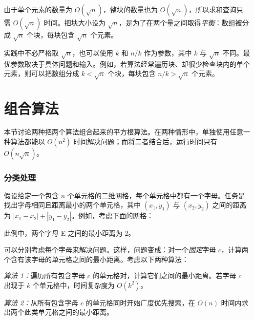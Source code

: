 由于单个元素的数量为 $O(\sqrt n)$，整块的数量也为 $O(\sqrt n)$，所以求和查询只需 $O(\sqrt n)$ 时间。把块大小设为 $\sqrt n$，是为了在两个量之间取得\emph{平衡}：数组被分成 $\sqrt n$ 个块，每块包含 $\sqrt n$ 个元素。

实践中不必严格取 $\sqrt n$，也可以使用 $k$ 和 $n/k$ 作为参数，其中 $k$ 与 $\sqrt n$ 不同。最优参数取决于具体问题和输入。例如，若算法经常遍历块、却很少检查块内的单个元素，则可以把数组分成 $k < \sqrt n$ 个块，每块包含 $n/k > \sqrt n$ 个元素。

\section{组合算法}

本节讨论两种把两个算法组合起来的平方根算法。在两种情形中，单独使用任意一种算法都能以 $O(n^2)$ 时间解决问题；而将二者结合后，运行时间只有 $O(n \sqrt n)$。

\subsubsection{分类处理}

假设给定一个包含 $n$ 个单元格的二维网格，每个单元格中都有一个字母。任务是找出字母相同且距离最小的两个单元格，其中 $(x_1,y_1)$ 与 $(x_2,y_2)$ 之间的距离为 $|x_1-x_2|+|y_1-y_2|$。例如，考虑下面的网格：

\begin{center}
\end{center}
此例中，两个字母 E 之间的最小距离为 2。

可以分别考虑每个字母来解决问题。这样，问题变成：对一个\emph{固定}字母 $c$，计算两个含有该字母的单元格之间的最小距离。考虑以下两种算法：

\emph{算法 1：}遍历所有包含字母 $c$ 的单元格对，计算它们之间的最小距离。若字母 $c$ 出现于 $k$ 个单元格中，时间复杂度为 $O(k^2)$。

\emph{算法 2：}从所有包含字母 $c$ 的单元格同时开始广度优先搜索，在 $O(n)$ 时间内求出两个此类单元格之间的最小距离。

